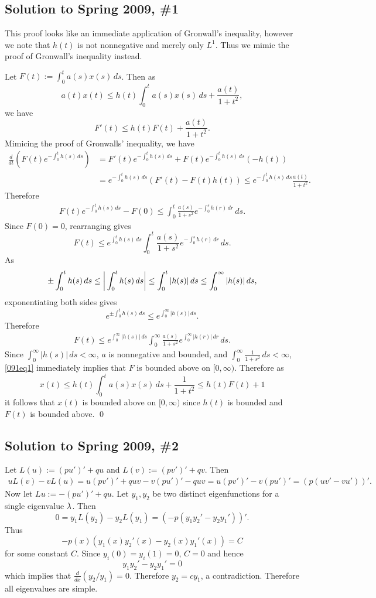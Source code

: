 \subsection*{Solution to Spring 2009, \#1}\label{s091}
This proof looks like an immediate application of Gronwall's inequality, however we note that $h(t)$ is not nonnegative and merely only $L^{1}$.
Thus we mimic the proof of Gronwall's inequality instead.

Let $F(t) := \int_{0}^{t}a(s)x(s)\, ds$. Then as
$$a(t)x(t) \leq h(t)\int_{0}^{t}a(s)x(s)\, ds + \frac{a(t)}{1 + t^{2}},$$
we have
$$F'(t) \leq h(t)F(t) + \frac{a(t)}{1 + t^{2}}.$$
Mimicing the proof of Gronwalls' inequality, we have
\begin{align*}
\frac{d}{dt}(F(t)e^{-\int_{0}^{t}h(s)\, ds}) &= F'(t)e^{-\int_{0}^{t}h(s)\, ds} + F(t)e^{-\int_{0}^{t}h(s)\, ds}(-h(t))\\
&= e^{-\int_{0}^{t}h(s)\, ds}(F'(t) - F(t)h(t)) \leq e^{-\int_{0}^{t}h(s)\, ds}\frac{a(t)}{1 + t^{2}}.
\end{align*}
Therefore
\begin{align*}
F(t)e^{-\int_{0}^{t}h(s)\, ds} - F(0) \leq \int_{0}^{t}\frac{a(s)}{1 + s^{2}}e^{-\int_{0}^{s}h(r)\, dr}\, ds.
\end{align*}
Since $F(0) = 0$, rearranging gives
$$F(t) \leq e^{\int_{0}^{t}h(s)\, ds}\int_{0}^{t}\frac{a(s)}{1 + s^{2}}e^{-\int_{0}^{s}h(r)\, dr}\, ds.$$
As
$$\pm \int_{0}^{t}h(s)\, ds \leq \bigg| \int_{0}^{t}h(s)\, ds \bigg| \leq \int_{0}^{t}|h(s)|\, ds \leq \int_{0}^{\infty}|h(s)|\, ds,$$
exponentiating both sides gives
$$e^{\pm \int_{0}^{t}h(s)\, ds} \leq e^{\int_{0}^{\infty}|h(s)|\, ds}.$$
Therefore
\begin{align}\label{091eq1}
F(t) \leq e^{\int_{0}^{\infty}|h(s)|\, ds}\int_{0}^{\infty}\frac{a(s)}{1 + s^{2}}e^{\int_{0}^{\infty}|h(r)|\, dr}\, ds.
\end{align}
Since $\int_{0}^{\infty}|h(s)|\, ds < \infty$, $a$ is nonnegative and bounded, and $\int_{0}^{\infty}\frac{1}{1 + s^{2}}\, ds < \infty$,
\eqref{091eq1} immediately implies that $F$ is bounded above on $[0, \infty)$.
Therefore as
$$x(t) \leq h(t)\int_{0}^{t}a(s)x(s)\, ds + \frac{1}{1 + t^{2}} \leq h(t)F(t) + 1$$
it follows that $x(t)$ is bounded above on $[0, \infty)$ since $h(t)$ is bounded and $F(t)$ is bounded above. \hfill\qed

\subsection*{Solution to Spring 2009, \#2}\label{s092}
Let $L(u) := (pu')' + qu$ and $L(v) := (pv')' + qv$. Then
\begin{align*}
uL(v) - vL(u) = u(pv')' + quv - v(pu')' - quv = u(pv')' - v(pu')' = (p(uv' - vu'))'.
\end{align*}
Now let $Lu := -(pu')' + qu$. Let $y_{1}, y_{2}$ be two distinct eigenfunctions for a single eigenvalue $\lambda$. Then
$$0 = y_{1}L(y_{2}) - y_{2}L(y_{1}) = (-p(y_{1}y_{2}' - y_{2}y_{1}'))'.$$
Thus
$$-p(x)(y_{1}(x)y_{2}'(x) - y_{2}(x)y_{1}'(x)) = C$$
for some constant $C$. Since $y_{i}(0) = y_{i}(1) = 0$, $C = 0$ and hence
$$y_{1}y_{2}' - y_{2}y_{1}' = 0$$
which implies that $\frac{d}{dx}(y_{2}/y_{1}) = 0$. Therefore $y_{2} = cy_{1}$, a contradiction. Therefore all eigenvalues
are simple.

